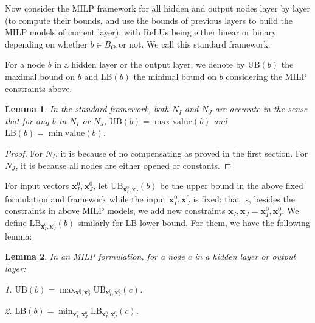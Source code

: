 \documentclass[]{article}
\newtheorem{lemma}{Lemma}
\theoremstyle{definition}
\newtheorem{definition}{Definition}
\newcommand{\Val}{\mathrm{value}}
\newcommand{\UB}{\mathrm{UB}}
\newcommand{\LB}{\mathrm{LB}}
\newcommand{\B}{\mathrm{B}}
\begin{document}
Now consider the MILP framework for all hidden and output nodes layer by layer (to compute their bounds, and use the bounds of previous layers to build the MILP models of current layer), with ReLUs being either linear or binary depending on whether $b \in B_{O}$ or not. We call this standard framework.

For a node $b$ in a hidden layer or the output layer, we denote by $\UB(b)$ the maximal bound on $b$ and $\LB(b)$ the minimal bound on $b$ considering the MILP constraints above.


\begin{lemma}
	In the standard framework, both $N_I$ and $N_J$ are accurate in the sense that for any $b$ in $N_I$ or $N_J$, $\UB(b)=\max\Val(b)$ and $\LB(b)=\min\Val(b)$.
\end{lemma}

\begin{proof}
	For $N_I$, it is because of no compensating as proved in the first section. For $N_J$, it is because all nodes are either opened or constants.
\end{proof}


%


For input vectors $\boldsymbol{x}^0_I,\boldsymbol{x}^0_J$, let $\UB_{\boldsymbol{x}^0_I,\boldsymbol{x}^0_J}(b)$ be the upper bound in the above fixed formulation and framework while the input $\boldsymbol{x}^0_I,\boldsymbol{x}^0_J$ is fixed: that is, besides the constraints in above MILP models, we add new constraints $\boldsymbol{x}_I,\boldsymbol{x}_J=\boldsymbol{x}^0_I,\boldsymbol{x}^0_J$. We  define $\LB_{\boldsymbol{x}^0_I,\boldsymbol{x}^0_J}(b)$ similarly for $\LB$ lower bound. For them, we have the following lemma:

\begin{lemma} In an MILP formulation, for a node $c$ in a hidden layer or output layer:
	
	1. $\UB(b)=\max_{\boldsymbol{x}^0_I,\boldsymbol{x}^0_J}\UB_{\boldsymbol{x}^0_I,\boldsymbol{x}^0_J}(c)$. 
	
		2. $\LB(b)=\min_{\boldsymbol{x}^0_I,\boldsymbol{x}^0_J}\LB_{\boldsymbol{x}^0_I,\boldsymbol{x}^0_J}(c)$. 
\end{lemma}
\end{document}
